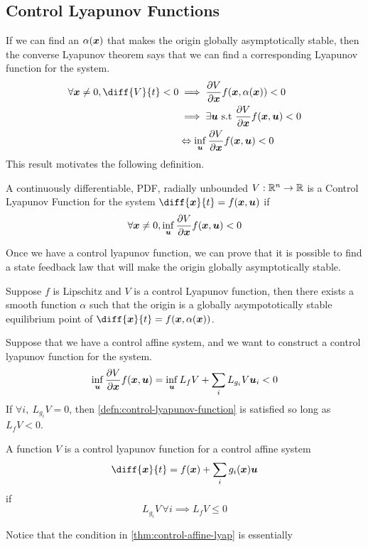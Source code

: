 \subsection{Control Lyapunov Functions}
If we can find an $\alpha(\boldsymbol{x})$ that makes the origin globally asymptotically
stable, then the converse Lyapunov theorem says that we can find a
corresponding Lyapunov function for the system.
\begin{align*}
	\forall \bs{x} \neq 0, \diff{V}{t} < 0 &\implies \frac{\partial V}{\partial
	\bs{x}} f(\bs{x}, \alpha(\bs{x})) < 0 \\
	&\implies \exists \bs{u} \text{ s.t } \frac{\partial V}{\partial \bs{x}} f(\bs{x},
	\bs{u}) < 0\\
	& \Leftrightarrow \inf_{\bs{u}} \frac{\partial V}{\partial \bs{x}} f(\bs{x}, \bs{u}) < 0
\end{align*}
This result motivates the following definition.
\begin{definition}
	A continuously differentiable, PDF, radially unbounded $V: \mathbb{R}^n \to \mathbb{R}$ is a
	Control Lyapunov Function for the system $\diff{\bs{x}}{t} = f(\bs{x},
	\bs{u})$ if \[
		\forall \boldsymbol{x} \neq 0, \inf_{\boldsymbol{u}} \frac{\partial V}{\partial \boldsymbol{x}}
		f(\boldsymbol{x}, \boldsymbol{u}) < 0
	\]
	\label{defn:control-lyapunov-function}
\end{definition}
Once we have a control lyapunov function, we can prove that it is possible to
find a state feedback law that will make the origin globally asymptotically
stable.
\begin{theorem}
	Suppose $f$ is Lipschitz and $V$ is a control Lyapunov function, then there
	exists a smooth function $\alpha$ such that the origin is a globally
	asympototically stable equilibrium point of $\diff{\bs{x}}{t} = f(\bs{x},
	\alpha(\bs{x}))$.
	\label{thm:artstein}
\end{theorem}
Suppose that we have a control affine system, and we want to construct a control
lyapunov function for the system. \[
	\inf_{\boldsymbol{u}} \frac{\partial V}{\partial \boldsymbol{x}}f(\boldsymbol{x}, \boldsymbol{u}) =
	\inf_{\boldsymbol{u}} L_f V + \sum_i L_{g_i} V \boldsymbol{u}_i < 0
\]
If $\forall i,\ L_{g_i} V = 0$, then \cref{defn:control-lyapunov-function} is
satisfied so long as $L_f V < 0$.
\begin{theorem}
	A function $V$ is a control lyapunov function for a control affine system \[
		\diff{\bs{x}}{t} = f(\bs{x}) + \sum_i g_i(\bs{x}) \bs{u}
	\] if \[
		L_{g_i} V\, \forall i \implies L_f V \leq 0
	\]
	\label{thm:control-affine-lyap}
\end{theorem}
Notice that the condition in \cref{thm:control-affine-lyap} is essentially
